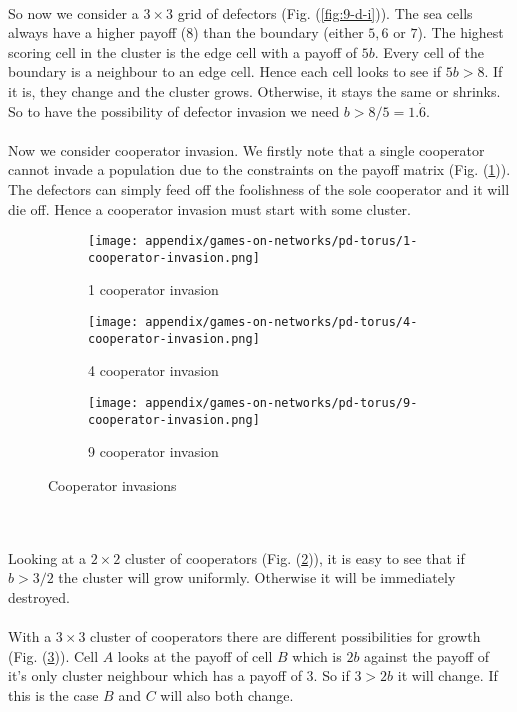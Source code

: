 \\
So now we consider a $3\times3$ grid of defectors (Fig. (\ref{fig:9-d-i})). The sea cells always have a higher payoff ($8$) than the boundary (either $5,6$ or $7$). The highest scoring cell in the cluster is the edge cell with a payoff of $5b$. Every cell of the boundary is a neighbour to an edge cell. Hence each cell looks to see if $5b>8$. If it is, they change and the cluster grows. Otherwise, it stays the same or shrinks. So to have the possibility of defector invasion we need $b>8/5=1.\dot6$.\\
\\
Now we consider cooperator invasion. We firstly note that a single cooperator cannot invade a population due to the constraints on the payoff matrix (Fig. (\ref{fig:1-c-i})). The defectors can simply feed off the foolishness of the sole cooperator and it will die off. Hence a cooperator invasion must start with some cluster.
\begin{figure}
	\centering
	\begin{subfigure}{.3\textwidth}
		\centering
		\texttt{[image: appendix/games-on-networks/pd-torus/1-cooperator-invasion.png]}
		\caption{1 cooperator invasion}
		\label{fig:1-c-i}
	\end{subfigure}%
	\begin{subfigure}{.3\textwidth}
		\centering
		\texttt{[image: appendix/games-on-networks/pd-torus/4-cooperator-invasion.png]}
		\caption{4 cooperator invasion}
		\label{fig:4-c-i}
	\end{subfigure}
	\begin{subfigure}{.3\textwidth}
		\centering
		\texttt{[image: appendix/games-on-networks/pd-torus/9-cooperator-invasion.png]}
		\caption{9 cooperator invasion}
		\label{fig:9-c-i}
	\end{subfigure}
	\caption{Cooperator invasions}
	\label{}
\end{figure}
\\
\\
Looking at a $2\times2$ cluster of cooperators (Fig. (\ref{fig:4-c-i})), it is easy to see that if $b>3/2$ the cluster will grow uniformly. Otherwise it will be immediately destroyed.\\
\\
With a $3\times3$ cluster of cooperators there are different possibilities for growth (Fig. (\ref{fig:9-c-i})). Cell $A$ looks at the payoff of cell $B$ which is $2b$ against the payoff of it's only cluster neighbour which has a payoff of $3$. So if $3>2b$ it will change. If this is the case $B$ and $C$ will also both change.\\
